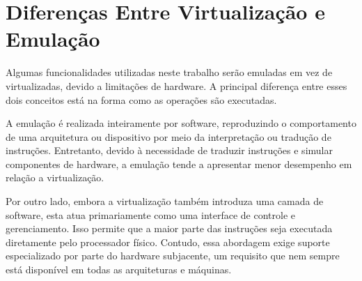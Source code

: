 \section{Diferenças Entre Virtualização e Emulação}

Algumas funcionalidades utilizadas neste trabalho serão emuladas em vez de virtualizadas, devido a limitações de hardware.
A principal diferença entre esses dois conceitos está na forma como as operações são executadas.

A emulação é realizada inteiramente por software, reproduzindo o comportamento de uma arquitetura ou dispositivo por meio da interpretação ou tradução
de instruções. Entretanto, devido à necessidade de traduzir instruções e simular componentes de hardware, a emulação tende a apresentar menor desempenho
em relação a virtualização.

Por outro lado, embora a virtualização também introduza uma camada de software, esta atua primariamente como uma interface de controle e gerenciamento.
Isso permite que a maior parte das instruções seja executada diretamente pelo processador físico. Contudo, essa abordagem exige suporte especializado
por parte do hardware subjacente, um requisito que nem sempre está disponível em todas as arquiteturas e máquinas.
